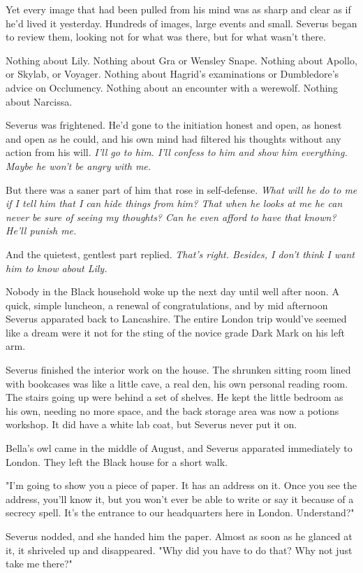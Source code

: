 \documentclass[a4paper,11pt]{article}
\begin{document}
Yet every image that had been pulled from his mind was as sharp and clear as if he'd lived it yesterday. Hundreds of images, large events and small. Severus began to review them, looking not for what was there, but for what wasn't there.

Nothing about Lily. Nothing about Gra or Wensley Snape. Nothing about Apollo, or Skylab, or Voyager. Nothing about Hagrid's examinations or Dumbledore's advice on Occlumency. Nothing about an encounter with a werewolf. Nothing about Narcissa.

Severus was frightened. He'd gone to the initiation honest and open, as honest and open as he could, and his own mind had filtered his thoughts without any action from his will. \emph{I'll go to him. I'll confess to him and show him everything. Maybe he won't be angry with me.}

But there was a saner part of him that rose in self-defense. \emph{What will he do to me if I tell him that I can hide things from him? That when he looks at me he can never be sure of seeing my thoughts? Can he even afford to have that known? He'll punish me.}

And the quietest, gentlest part replied. \emph{That's right. Besides, I don't think I want him to know about Lily.}

Nobody in the Black household woke up the next day until well after noon. A quick, simple luncheon, a renewal of congratulations, and by mid afternoon Severus apparated back to Lancashire. The entire London trip would've seemed like a dream were it not for the sting of the novice grade Dark Mark on his left arm.

Severus finished the interior work on the house. The shrunken sitting room lined with bookcases was like a little cave, a real den, his own personal reading room. The stairs going up were behind a set of shelves. He kept the little bedroom as his own, needing no more space, and the back storage area was now a potions workshop. It did have a white lab coat, but Severus never put it on.

Bella's owl came in the middle of August, and Severus apparated immediately to London. They left the Black house for a short walk.

"I'm going to show you a piece of paper. It has an address on it. Once you see the address, you'll know it, but you won't ever be able to write or say it because of a secrecy spell. It's the entrance to our headquarters here in London. Understand?"

Severus nodded, and she handed him the paper. Almost as soon as he glanced at it, it shriveled up and disappeared. "Why did you have to do that? Why not just take me there?"
\end{document}
